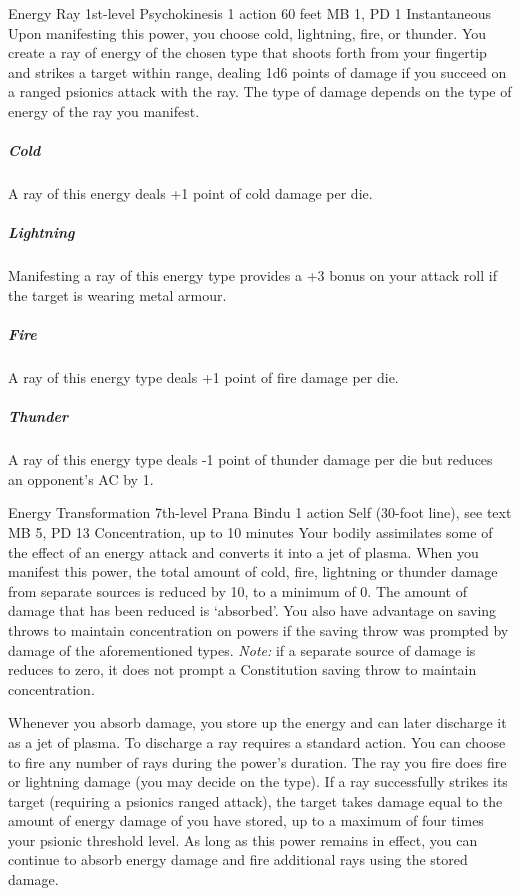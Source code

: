 \DndPowerHeader%
  {Energy Ray}
  {1st-level Psychokinesis}
  {1 action}
  {60 feet}
  {MB 1, PD 1}
  {Instantaneous}
Upon manifesting this power,
you choose cold, lightning, fire, or thunder.
You create a ray of energy of the chosen type that
shoots forth from your fingertip and strikes a target within range,
dealing 1d6 points of damage if you succeed on a
ranged psionics attack with the ray.
The type of damage depends on
the type of energy of the ray you manifest. 
  \subparagraph{Cold}
    A ray of this energy deals +1 point of cold damage per die.
  \subparagraph{Lightning}
    Manifesting a ray of this energy type provides a
    +3 bonus on your attack roll if the target is wearing metal armour.
  \subparagraph{Fire}
    A ray of this energy type deals +1 point of fire damage per die.
  \subparagraph{Thunder}
    A ray of this energy type deals -1 point of thunder damage per die
    but reduces an opponent's AC by 1.

\DndPowerHeader%
  {Energy Transformation}
  {7th-level Prana Bindu}
  {1 action}
  {Self (30-foot line), see text}
  {MB 5, PD 13}
  {Concentration, up to 10 minutes}
  Your bodily assimilates some of the effect of an
  energy attack and converts it into a jet of plasma.
  When you manifest this power,
  the total amount of cold, fire,
  lightning or thunder damage
  from separate sources is reduced by 10,
  to a minimum of 0.
  The amount of damage that has been reduced
  is `absorbed'.
  You also have advantage on saving throws to
  maintain concentration on powers if the
  saving throw was prompted by damage of the
  aforementioned types.
  \emph{Note:} if a separate source of damage is
  reduces to zero, it does not prompt a Constitution
  saving throw to maintain concentration.
  
  Whenever you absorb damage,
  you store up the energy and can later discharge it
  as a jet of plasma.
  To discharge a ray requires a standard action.
  You can choose to fire any number of rays
  during the power's duration.
  The ray you fire does fire or lightning damage
  (you may decide on the type).
  If a ray successfully strikes its target
  (requiring a psionics ranged attack),
  the target takes damage equal to the amount of energy damage
  of you have stored,
  up to a maximum of four times your psionic threshold level.
  As long as this power remains in effect,
  you can continue to absorb energy damage and
  fire additional rays using the stored damage.


